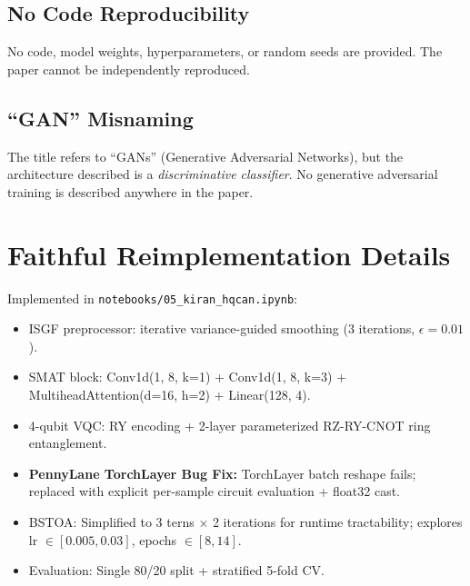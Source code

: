 \documentclass[12pt,a4paper]{article}
\begin{document}
\subsection{No Code Reproducibility}
No code, model weights, hyperparameters, or random seeds are provided. The paper cannot be independently reproduced.

\subsection{``GAN'' Misnaming}
The title refers to ``GANs'' (Generative Adversarial Networks), but the architecture described is a \emph{discriminative classifier}. No generative adversarial training is described anywhere in the paper.

\section{Faithful Reimplementation Details}
Implemented in \texttt{notebooks/05\_kiran\_hqcan.ipynb}:
\begin{itemize}[leftmargin=*]
  \item ISGF preprocessor: iterative variance-guided smoothing (3 iterations, $\epsilon=0.01$).
  \item SMAT block: Conv1d(1, 8, k=1) + Conv1d(1, 8, k=3) + MultiheadAttention(d=16, h=2) + Linear(128, 4).
  \item 4-qubit VQC: RY encoding + 2-layer parameterized RZ-RY-CNOT ring entanglement.
  \item \textbf{PennyLane TorchLayer Bug Fix:} TorchLayer batch reshape fails; replaced with explicit per-sample circuit evaluation + float32 cast.
  \item BSTOA: Simplified to 3 terns $\times$ 2 iterations for runtime tractability; explores lr $\in [0.005, 0.03]$, epochs $\in [8, 14]$.
  \item Evaluation: Single 80/20 split + stratified 5-fold CV.
\end{itemize}

\end{document}
